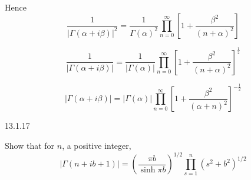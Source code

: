 Hence
$$
\frac{1}{|\Gamma(\alpha+i \beta)|^{2}}=\frac{1}{\Gamma(\alpha)^{2}} \prod_{n=0}^{\infty}\left[1+\frac{\beta^{2}}{(n+\alpha)^{2}}\right]
$$

$$
\frac{1}{|\Gamma(\alpha+i \beta)|}=\frac{1}{|\Gamma(\alpha)|} \prod_{n=0}^{\infty}\left[1+\frac{\beta^{2}}{(n+\alpha)^{2}}\right]^{\frac{1}{2}}
$$

$$
|\Gamma(\alpha+i \beta)|=|\Gamma(\alpha)| \prod_{n=0}^{\infty}\left[1+\frac{\beta^{2}}{(\alpha+n)^{2}}\right]^{-\frac{1}{2}}
$$



\newpage

\begin{mybox}{13.1.17}

Show that for $n$, a positive integer,
$$
|\Gamma(n+i b+1)|=\left(\frac{\pi b}{\sinh \pi b}\right)^{1 / 2} \prod_{s=1}^{n}\left(s^{2}+b^{2}\right)^{1 / 2}
$$
\end{mybox}


